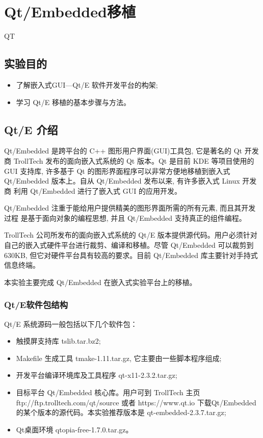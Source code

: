 \chapter{Qt/Embedded移植}{QT}

\section{实验目的}
\begin{itemize}
    \item 了解嵌入式GUI---Qt/E 软件开发平台的构架;
    \item 学习 Qt/E 移植的基本步骤与方法。
\end{itemize}

\section{Qt/E 介绍}
Qt/Embedded 是跨平台的 C++ 图形用户界面(GUI)工具包, 它是著名的 Qt 开发商
TrollTech 发布的面向嵌入式系统的 Qt 版本。Qt 是目前 KDE 等项目使用的 GUI
支持库, 许多基于 Qt 的图形界面程序可以非常方便地移植到嵌入式
Qt/Embedded 版本上。自从 Qt/Embedded 发布以来, 有许多嵌入式 Linux 开发商
利用 Qt/Embedded 进行了嵌入式 GUI 的应用开发。

Qt/Embedded 注重于能给用户提供精美的图形界面所需的所有元素, 而且其开发过程
是基于面向对象的编程思想, 并且 Qt/Embedded 支持真正的组件编程。

TrollTech 公司所发布的面向嵌入式系统的 Qt/E 版本提供源代码。用户必须针对
自己的嵌入式硬件平台进行裁剪、编译和移植。尽管 Qt/Embedded 可以裁剪到630KB,
但它对硬件平台具有较高的要求。目前 Qt/Embedded 库主要针对手持式信息终端。

本实验主要完成 Qt/Embedded 在嵌入式实验平台上的移植。
\subsection{Qt/E软件包结构}
Qt/E 系统源码一般包括以下几个软件包：
\begin{itemize}
    \item 触摸屏支持库 tslib.tar.bz2;
    \item Makefile 生成工具 tmake-1.11.tar.gz, 它主要由一些脚本程序组成;
    \item 开发平台编译环境库及工具程序 qt-x11-2.3.2.tar.gz;
    \item 目标平台 Qt/Embedded 核心库。用户可到 TrollTech 主页
        ftp://ftp.trolltech.com/qt/source 或者 https://www.qt.io
        下载Qt/Embedded的某个版本的源代码。本实验推荐版本是
        qt-embedded-2.3.7.tar.gz;
    \item Qt桌面环境 qtopia-free-1.7.0.tar.gz。
\end{itemize}

